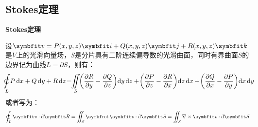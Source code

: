 \subsection{Stokes定理}
\begin{theorem}
    \textbf{Stokes定理}

    设$\vb{v}=P(x,y,z)\vb{i} + Q(x,y,z)\vb{j} + R(x,y,z)\vb{k}$是$V$上的光滑向量场，$S$是分片具有二阶连续偏导数的光滑曲面，同时有界曲面$S$的边界记为曲线$L=\partial S$，则有：
    \[\!\!\underset{L}{\oint} P\dd{x}+Q\dd{y}+R\dd{z}\! = \!\!\underset{S}{\iint}\!\!\left(\pdv{R}{y}-\pdv{Q}{z}\right)\!\dd{y}\dd{z} + \!\left(\pdv{P}{z}-\pdv{R}{x}\right)\!\dd{z}\dd{x} + \!\left(\pdv{Q}{x}-\pdv{P}{y}\right)\!\dd{x}\dd{y}\!\!\!\!\]
    或者写为：
    \[\oint_L\vb{v}\cdot\dd{\vb{R}} = \iint_S\rot\vb{v}\cdot\dd{\vb{S}} = \iint_S \nabla\times\vb{v}\cdot\dd{\vb{S}}\]
\end{theorem}

